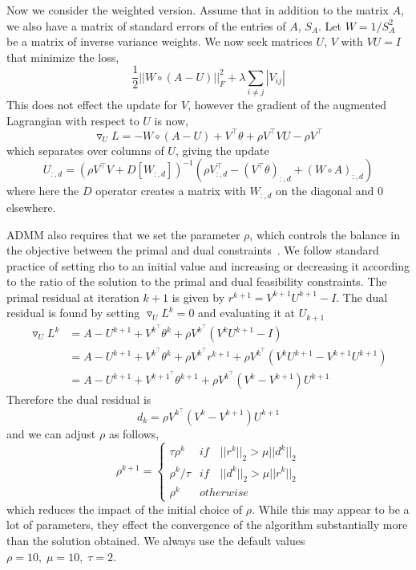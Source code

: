 \documentclass{article}
\begin{document}
Now we consider the weighted version. Assume that in addition to the matrix $A$, we
also have a matrix of standard errors of the entries of $A$, $S_A$. Let
$W = 1/S_A^2$ be a matrix of inverse variance weights. We now
seek matrices $U$, $V$ with $VU=I$ that minimize the loss,
\begin{equation}\label{opt_weights}
\frac{1}{2} || W \circ (A - U)||_F^2 + \lambda \sum_{i\neq j}|V_{ij}|
\end{equation}
This does not effect the update for $V$, however the gradient of the augmented
Lagrangian with respect to $U$ is now,
\begin{equation*}
\triangledown_U L = - W \circ (A- U) + V^\top \theta + \rho V^\top V U - \rho V^\top
\end{equation*}
which separates over columns of $U$, giving the update
\begin{equation}
U_{:, d} = (\rho V^\top V + D[W_{:, d}])^{-1}(\rho V^\top_{:, d} -
  (V^\top \theta)_{:, d} + (W \circ A)_{:, d})
\end{equation}
where here the $D$ operator creates a matrix with $W_{:, d}$ on the
diagonal and 0 elsewhere.


ADMM also requires that we set the parameter $\rho$, which controls the
balance in the objective between the primal and dual constraints~\cite{Boyd2010}. We
follow standard practice of setting rho to an initial value and increasing
or decreasing it according to the ratio of the solution to the primal
and dual feasibility constraints. The primal residual at iteration $k+1$ is
given by $r^{k+1} = V^{k+1} U^{k+1} - I$. The dual residual is found by
setting $\triangledown_{U} L^k = 0$ and evaluating it at $U_{k+1}$
\begin{align*}
\triangledown_U L^{k} &= A - U^{k+1} + V^{k^\top} \theta^k + \rho V^{k^\top}(V^k U^{k+1}-I) \\
  &= A - U^{k+1} + V^{k^\top} \theta^k + \rho V^{k^\top}r^{k+1} + \rho V^{k^\top}(V^k U^{k+1}-V^{k+1} U^{k+1}) \\
  &= A - U^{k+1} + V^{k+1^\top} \theta^{k+1} + \rho V^{k^\top}(V^k - V^{k+1})U^{k+1}
\end{align*}
Therefore the dual residual is~\cite{Boyd2010}
\begin{equation*}
d_k = \rho V^{k^\top}(V^k - V^{k+1})U^{k+1}
\end{equation*}
and we can adjust $\rho$ as follows,
\begin{equation*}
\rho^{k+1} = \left\{ \begin{array}{ll}
  \tau \rho^k & if\quad ||r^k||_2 > \mu ||d^k||_2 \\
  \rho^k/\tau & if\quad ||d^k||_2 > \mu ||r^k||_2 \\
  \rho^k & otherwise \end{array} \right.
\end{equation*}
which reduces the impact of the initial choice of $\rho$. While this
may appear to be a lot of parameters, they effect the convergence of
the algorithm substantially more than the solution obtained.
We always use the default values $\rho = 10,\;\mu = 10,\;\tau = 2$.
\end{document}

